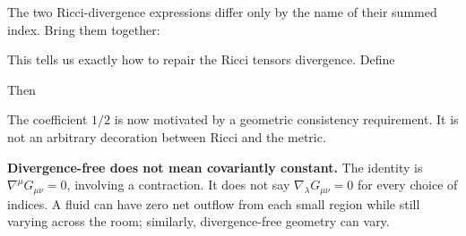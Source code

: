 \documentclass[
  11pt,
  letterpaper,
  oneside,
  openany]{scrbook}
\begin{document}
\begin{center}
\begingroup
{}
\ifdim\wd\grmathbox>\linewidth
\resizebox{\linewidth}{!}{\usebox{\grmathbox}}
\else\usebox{\grmathbox}\fi
\endgroup
\end{center}

The two Ricci-divergence expressions differ only by the name of their
summed index. Bring them together:

\begin{center}
\begingroup
{}
\ifdim\wd\grmathbox>\linewidth
\resizebox{\linewidth}{!}{\usebox{\grmathbox}}
\else\usebox{\grmathbox}\fi
\endgroup
\end{center}

This tells us exactly how to repair the Ricci tensor\textquotesingle s
divergence. Define

\begin{center}
\begingroup
{}
\ifdim\wd\grmathbox>\linewidth
\resizebox{\linewidth}{!}{\usebox{\grmathbox}}
\else\usebox{\grmathbox}\fi
\endgroup
\end{center}

Then

\begin{center}
\begingroup
{}
\ifdim\wd\grmathbox>\linewidth
\resizebox{\linewidth}{!}{\usebox{\grmathbox}}
\else\usebox{\grmathbox}\fi
\endgroup
\end{center}

The coefficient \(1/2\) is now motivated by a geometric consistency
requirement. It is not an arbitrary decoration between Ricci and the
metric.

\textbf{Divergence-free does not mean covariantly constant.} The
identity is \(\nabla^\mu G_{\mu\nu}=0\), involving a contraction. It
does not say \(\nabla_\lambda G_{\mu\nu}=0\) for every choice of
indices. A fluid can have zero net outflow from each small region while
still varying across the room; similarly, divergence-free geometry can
vary.
\end{document}
